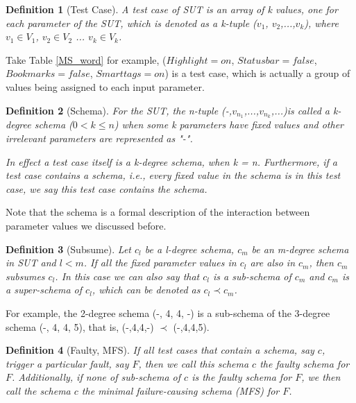 \documentclass[10pt,journal,cspaper,compsoc]{IEEEtran}
\begin{document}
\newtheorem{definition}{Definition}
\newtheorem{assumption}{Assumption}

\begin{definition}[Test Case]\label{de:test}
A \emph{test case} of SUT is an array of \emph{k} values, one for each parameter of the SUT, which is denoted as a \emph{k}-tuple ($v_{1}$, $v_{2}$,...,$v_{k}$), where $v_{1}\in V_{1}$, $v_{2} \in V_{2}$ ... $v_{k} \in V_{k}$.
\end{definition}

Take Table \ref{MS_word} for example, ($Highlight = on$, $Status bar = false$, $Bookmarks = false$, $Smart tags = on$) is a test case, which is actually a group of values being assigned to each input parameter.

\begin{definition}[Schema]\label{de:tuple}
For the SUT, the \emph{n}-tuple (-,$v_{n_{1}}$,...,$v_{n_{k}}$,...)is called a \emph{k}-degree \emph{schema} ($0 < k \leq n $) when some k parameters have fixed values and other irrelevant parameters are represented as "-".

In effect a test case itself is a k-degree \emph{schema}, when k = n. Furthermore, if a test case contains a \emph{schema}, i.e., every fixed value in the schema is in this test case, we say this test case \emph{contains} the \emph{schema}.
\end{definition}
Note that the schema is a formal description of the interaction between parameter values we discussed before.

\begin{definition}[Subsume]\label{de:sub}
Let $c_{l}$ be a \emph{l}-degree schema, $c_{m}$ be an \emph{m}-degree schema in SUT and $l < m$. If all the fixed parameter values in $c_{l}$ are also in $c_{m}$, then $c_{m}$ \emph{subsumes} $c_{l}$. In this case we can also say that $c_{l}$ is a \emph{sub-schema} of $c_{m}$ and $c_{m}$ is a \emph{super-schema} of $c_{l}$, which can be denoted as $c_{l} \prec  c_{m}$.
\end{definition}

For example,  the 2-degree schema (-, 4, 4, -) is a sub-schema of the 3-degree schema (-, 4, 4, 5), that is, (-,4,4,-) $\prec$ (-,4,4,5).

\begin{definition}[Faulty, MFS]\label{de:faulty:minimal}
If all test cases that contain a schema, say $c$, trigger a particular fault, say $F$, then we call this schema $c$ the \emph{faulty schema} for $F$. Additionally, if none of sub-schema of $c$ is the \emph{faulty schema} for $F$, we then call the schema $c$ the \emph{minimal failure-causing schema (MFS)} \cite{nie2011minimal} for $F$.
\end{definition}
\end{document}
